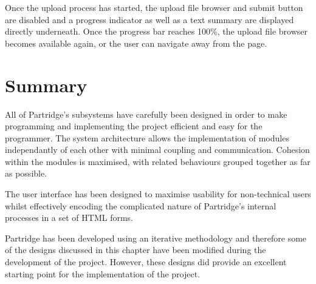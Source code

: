 Once the upload process has started, the upload file browser and submit button
are disabled and a progress indicator as well as a text summary are displayed
directly underneath. Once the progress bar reaches 100\%, the upload file
browser becomes available again, or the user can navigate away from the page.

\section{ Summary}

All of Partridge's subsystems have carefully been designed in order to make
programming and implementing the project efficient and easy for the programmer.
The system architecture allows the implementation of modules independantly of
each other with minimal coupling and communication. Cohesion within the modules
is maximised, with related behaviours grouped together as far as possible.

The user interface has been designed to maximise usability for non-technical
users whilst effectively encoding the complicated nature of Partridge's
internal processes in a set of HTML forms.

Partridge has been developed using an iterative methodology and therefore some
of the designs discussed in this chapter have been modified during the
development of the project. However, these designs did provide an excellent
starting point for the implementation of the project.
